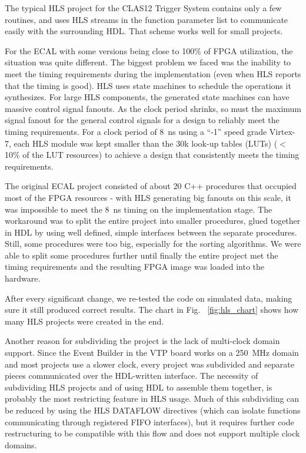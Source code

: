 The typical HLS project for the CLAS12 Trigger System contains only a few routines, and uses HLS streams
in the function parameter list to communicate easily with the surrounding HDL. That scheme works well for
small projects.

For the ECAL with some versions being close to 100\% of FPGA utilization, the situation was quite different.
The biggest problem we faced was the inability to meet the timing requirements during the implementation
(even when HLS reports that the timing is good). HLS uses state machines to schedule the operations it
synthesizes. For large HLS components, the generated state machines can have massive control signal fanouts.
As the clock period shrinks, so must the maximum signal fanout for the general control signals for a design to
reliably meet the timing requirements. For a clock period of 8~ns using a ``-1'' speed grade Virtex-7, each
HLS module was kept smaller than the 30k look-up tables (LUTs) ($<$10\% of the LUT resources) to achieve
a design that consistently meets the timing requirements.

The original ECAL project consisted of about 20 C++ procedures that occupied most of the FPGA resources -
with HLS generating big fanouts on this scale, it was impossible to meet the 8~ns timing on the implementation
stage. The workaround was to split the entire project into smaller procedures, glued together in HDL by using
well defined, simple interfaces between the separate procedures. Still, some procedures were too big,
especially for the sorting algorithms. We were able to split some procedures further until finally the entire
project met the timing requirements and the resulting FPGA image was loaded into the hardware.

After every significant change, we re-tested the code on simulated data, making sure it still produced correct
results. The chart in Fig. ~\ref{fig:hls_chart} shows how many HLS projects were created in the end.

Another reason for subdividing the project is the lack of multi-clock domain support. Since the Event Builder
in the VTP board works on a 250~MHz domain and most projects use a slower clock, every project was
subdivided and separate pieces communicated over the HDL-written interface. The necessity of subdividing
HLS projects and of using HDL to assemble them together, is probably the most restricting feature in HLS
usage. Much of this subdividing can be reduced by using the HLS DATAFLOW directives (which can isolate
functions communicating through registered FIFO interfaces), but it requires further code restructuring to
be compatible with this flow and does not support multiple clock domains.

